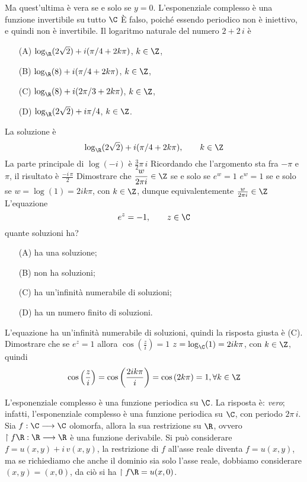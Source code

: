 Ma quest'ultima è vera se e solo se $y=0$.
    L'esponenziale complesso è una funzione invertibile su tutto $ \C $
    È falso, poiché essendo periodico non è iniettivo, e quindi non è invertibile.
    Il logaritmo naturale del numero $ 2+2\,i $ è \begin{itemize}
        \item[(A)] $\log_{\R} (2\sqrt{2})+i(\pi/4+2k\pi)$, $ k \in \Z $, 
        \item[(B)] $\log_{\R}(8)+i(\pi/4+2k\pi)$, $ k \in \Z $, 
        \item[(C)] $\log_{\R}(8)+i(2\pi/3+2k\pi)$, $ k \in \Z $, 
        \item[(D)]$\log_{\R}(2\sqrt{2})+i\pi/4$, $ k \in \Z $.
    \end{itemize}
    La soluzione è \[
        \log_{\R} (2\sqrt{2})+i(\pi/4+2k\pi),\qquad k \in \Z
    \]
    La parte principale di $ \log(-i) $ è $ \frac{3}{2}\pi\,i $
Ricordando che l'argomento sta fra $-\pi$ e $\pi$, il risultato è $\frac{-i\,\pi}{2}$ 
    Dimostrare che $\displaystyle \frac{w}{2\pi i}  \in \Z$ se e solo se $\displaystyle e^w=1$   
    $e^w=1$ se e solo se $w=\log(1)=2ik\pi$, con $k \in \Z$, dunque equivalentemente $\frac{w}{2\pi i}  \in \Z$
    L'equazione \[
        e^{z} = -1,\qquad z \in \C
    \]quante soluzioni ha? \begin{itemize}
        \item[(A)] ha una soluzione; 
        \item[(B)] non ha soluzioni; 
        \item[(C)] ha un'infinità numerabile di soluzioni; 
        \item[(D)] ha un numero finito di soluzioni.
    \end{itemize}
    L'equazione ha un'infinità numerabile di soluzioni, quindi la risposta giusta è (C). 
    Dimostrare che se $e^z=1$ allora $\cos(\frac{z}{i})=1$
    $z=\log_{\C} (1)=2ik\pi$, con $k \in \Z$, quindi \[
        \cos\left(\frac{z}{i}\right)=\cos\left(\frac{2ik\pi}{i}\right)=\cos\left(2k\pi\right)=1, \forall k \in \Z
    \]

L'esponenziale complesso è una funzione periodica su $ \C $.
    La risposta è: \emph{vero}; infatti, l'esponenziale complesso è una funzione periodica su $ \C $, con periodo $ 2\pi \,i $.
    Sia $f : \C \longrightarrow \C$ olomorfa, allora la sua restrizione su $\R$, ovvero $\restriction{f}{\R} : \R \longrightarrow \R$ è una funzione derivabile.
    Si può considerare $f = u(x,y) + i\, v(x,y)$, la restrizione di $f$ all'asse reale diventa $f = u(x,y)$, ma se richiediamo che anche il dominio sia solo l'asse reale, dobbiamo considerare $(x,y) = (x,0)$, da ciò si ha
    $\restriction{f}{\R} = u(x,0)$. 
    
